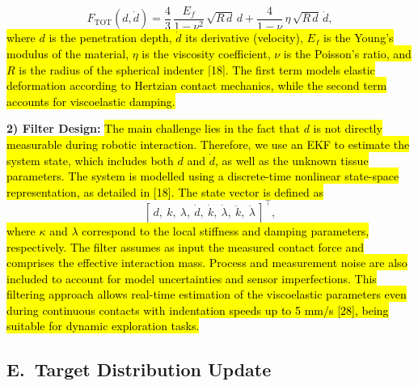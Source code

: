 \documentclass[11pt]{article}
\begin{document}
\begin{equation}
F_{\mathrm{TOT}}(d, \dot{d}) =
\frac{4}{3}\, \frac{E_{f}}{1 - \nu^{2}}\, \sqrt{R\, d}\, d
+ \frac{4}{1 - \nu}\, \eta\, \sqrt{R\, d}\, \dot{d},
\end{equation}
\hl{where $d$ is the penetration depth, $\dot{d}$ its derivative
(velocity), $E_{f}$ is the Young's modulus of the material, $\eta$
is the viscosity coefficient, $\nu$ is the Poisson's ratio, and $R$
is the radius of the spherical indenter [18]. The first term models
elastic deformation according to Hertzian contact mechanics, while
the second term accounts for viscoelastic damping.}

\textbf{2) Filter Design:} \hl{The main challenge lies in the fact that
$d$ is not directly measurable during robotic interaction. Therefore,
we use an EKF to estimate the system state, which includes both $d$
and $\dot{d}$, as well as the unknown tissue parameters. The system
is modelled using a discrete-time nonlinear state-space
representation, as detailed in [18]. The state vector is defined as}
\[
[\,d,\ k,\ \lambda,\ \dot{d},\ \dot{k},\ \dot{\lambda},\ \ddot{k},\
\ddot{\lambda}\,]^{\top},
\]
\hl{where $\kappa$ and $\lambda$ correspond to the local stiffness and
damping parameters, respectively. The filter assumes as input the
measured contact force and comprises the effective interaction mass.
Process and measurement noise are also included to account for model
uncertainties and sensor imperfections. This filtering approach
allows real-time estimation of the viscoelastic parameters even
during continuous contacts with indentation speeds up to 5 mm/s
[28], being suitable for dynamic exploration tasks.}

\subsection*{E.\ Target Distribution Update}
\end{document}
